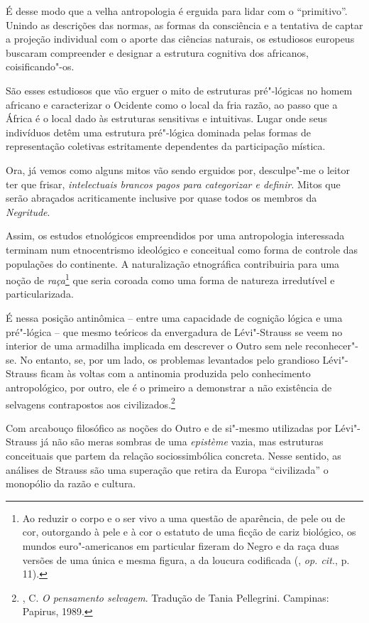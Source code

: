 É desse modo que a velha antropologia é erguida para lidar com o
``primitivo''. Unindo as descrições das normas, as formas da consciência
e a tentativa de captar a projeção individual com o aporte das ciências
naturais, os estudiosos europeus buscaram compreender e designar a
estrutura cognitiva dos africanos, coisificando"-os.

São esses estudiosos que vão erguer o mito de estruturas pré"-lógicas no
homem africano e caracterizar o Ocidente como o local da fria razão, ao
passo que a África é o local dado às estruturas sensitivas e intuitivas.
Lugar onde seus indivíduos detêm uma estrutura pré"-lógica dominada pelas
formas de representação coletivas estritamente dependentes da
participação mística.

Ora, já vemos como alguns mitos vão sendo erguidos por, desculpe"-me o
leitor ter que frisar, \emph{intelectuais brancos pagos para categorizar
e definir}. Mitos que serão abraçados acriticamente inclusive por quase
todos os membros da \emph{Negritude}.

Assim, os estudos etnológicos empreendidos por uma antropologia
interessada terminam num etnocentrismo ideológico e conceitual como
forma de controle das populações do continente. A naturalização
etnográfica contribuiria para uma noção de \emph{raça}\footnote{Ao
  reduzir o corpo e o ser vivo a uma questão de aparência, de pele ou de
  cor, outorgando à pele e à cor o estatuto de uma ficção de cariz
  biológico, os mundos euro"-americanos em particular fizeram do Negro e
  da raça duas versões de uma única e mesma figura, a da loucura
  codificada (, \emph{op. cit.}, p. 11).} que seria coroada como uma
forma de natureza irredutível e particularizada.

É nessa posição antinômica -- entre uma capacidade de cognição lógica e
uma pré"-lógica -- que mesmo teóricos da envergadura de Lévi"-Strauss se
veem no interior de uma armadilha implicada em descrever o Outro sem
nele reconhecer"-se. No entanto, se, por um lado, os problemas levantados
pelo grandioso Lévi"-Strauss ficam às voltas com a antinomia produzida
pelo conhecimento antropológico, por outro, ele é o primeiro a
demonstrar a não existência de selvagens contrapostos aos
civilizados.\footnote{, C. \emph{O pensamento selvagem}.
  Tradução de Tania Pellegrini. Campinas: Papirus, 1989.}

Com arcabouço filosófico as noções do Outro e de si"-mesmo utilizadas por
Lévi"-Strauss já não são meras sombras de uma \emph{epistème} vazia, mas
estruturas conceituais que partem da relação sociossimbólica concreta.
Nesse sentido, as análises de Strauss são uma superação que retira da
Europa ``civilizada'' o monopólio da razão e cultura.

